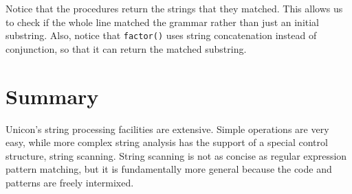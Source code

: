 Notice that the procedures return the strings that they matched. This
allows us to check if the whole line matched the grammar rather than
just an initial substring. Also, notice that \texttt{factor()} uses
string concatenation instead of conjunction, so that it can return the
matched substring.

\section*{Summary}

Unicon's string processing facilities are extensive.
Simple operations are very easy, while more complex string analysis has
the support of a special control structure, string scanning. String
scanning is not as concise as regular expression pattern matching, but
it is fundamentally more general because the code and patterns are
freely intermixed.

